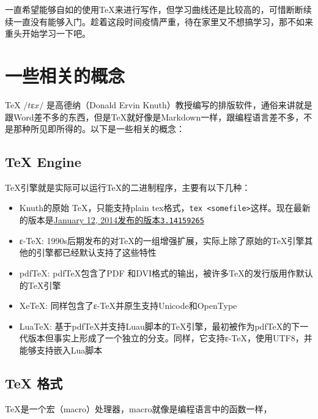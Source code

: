 \documentclass[12pt]{article}
\begin{document}
\makeblogtitle

一直希望能够自如的使用TeX来进行写作，但学习曲线还是比较高的，可惜断断续续一直没有能够入门。趁着这段时间疫情严重，待在家里又不想搞学习，那不如来重头开始学习一下吧。

\section{一些相关的概念}\label{ux4e00ux4e9bux76f8ux5173ux7684ux6982ux5ff5}

TeX \(/tɛx/\) 是高德纳（Donald Ervin Knuth）教授编写的排版软件，通俗来讲就是跟Word差不多的东西，但是TeX就好像是Markdown一样，跟编程语言差不多，不是那种所见即所得的。以下是一些相关的概念：

\subsection{TeX Engine}\label{tex-engine}

TeX引擎就是实际可以运行TeX的二进制程序，主要有以下几种：

\begin{itemize}
\tightlist
\item
  Knuth的原始 TeX，只能支持plain tex格式，\texttt{tex\ \textless{}somefile\textgreater{}}这样。现在最新的版本是\href{ftp://ftp.cs.stanford.edu/pub/tex/tex14.tar.gz}{January 12, 2014发布的版本\texttt{3.14159265}}
\item
  ε-TeX: 1990s后期发布的对TeX的一组增强扩展，实际上除了原始的TeX引擎其他的引擎都已经默认支持了这些特性
\item
  pdfTeX: pdfTeX包含了PDF 和DVI格式的输出，被许多TeX的发行版用作默认的TeX引擎
\item
  XeTeX: 同样包含了ε-TeX并原生支持Unicode和OpenType
\item
  LuaTeX: 基于pdfTeX并支持Luau脚本的TeX引擎，最初被作为pdfTeX的下一代版本但事实上形成了一个独立的分支。同样，它支持ε-TeX，使用UTF8，并能够支持嵌入Lua脚本
\end{itemize}

\subsection{TeX 格式}\label{tex-ux683cux5f0f}

TeX是一个宏（macro）处理器，macro就像是编程语言中的函数一样，

\begin{Shaded}
\begin{Highlighting}[]
\end{Highlighting}
\end{Shaded}
\end{document}
